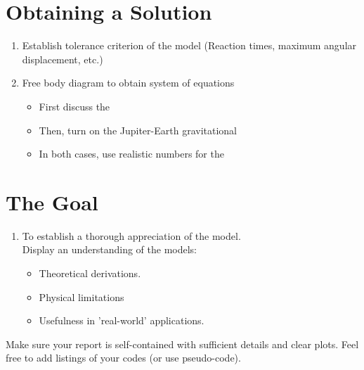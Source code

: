 \documentclass{report}
\begin{document}
\section*{Obtaining a Solution}

\begin{enumerate}

\item Establish tolerance criterion of the model (Reaction times, maximum angular displacement, etc.)

\item Free body diagram to obtain system of equations 

	\begin{itemize}

\item First discuss the

\item Then, turn on the Jupiter-Earth gravitational

\item In both cases, use realistic numbers for the 

\end{itemize}

\end{enumerate}






\section*{The Goal}

\begin{enumerate}

\item To establish a thorough appreciation of the model. \\Display an understanding of the models:

	\begin{itemize}

\item Theoretical derivations.

\item Physical limitations

\item Usefulness in 'real-world' applications.

\end{itemize}

\end{enumerate}



Make sure your report is self-contained with sufficient details and
clear plots. Feel free to add listings of your codes (or use
pseudo-code). 
\end{document}
